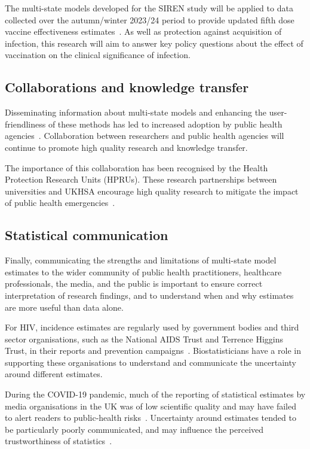 The multi-state models developed for the SIREN study will be applied to data collected over the autumn/winter 2023/24 period to provide updated fifth dose vaccine effectiveness estimates~\parencite{UK_Health_Security_Agency2023-xb}. As well as protection against acquisition of infection, this research will aim to answer key policy questions about the effect of vaccination on the clinical significance of infection.

\subsection{Collaborations and knowledge transfer}

Disseminating information about multi-state models and enhancing the user-friendliness of these methods has led to increased adoption by public health agencies~\parencite{van-Sighem2015-zo, Kirwan2024-hj}. Collaboration between researchers and public health agencies will continue to promote high quality research and knowledge transfer.

The importance of this collaboration has been recognised by the Health Protection Research Units (HPRUs). These research partnerships between universities and UKHSA encourage high quality research to mitigate the impact of public health emergencies~\parencite{National-Institute-for-Health-and-Care-Research2024-oq}.

\subsection{Statistical communication}

Finally, communicating the strengths and limitations of multi-state model estimates to the wider community of public health practitioners, healthcare professionals, the media, and the public is important to ensure correct interpretation of research findings, and to understand when and why estimates are more useful than data alone.

For HIV, incidence estimates are regularly used by government bodies and third sector organisations, such as the National AIDS Trust and Terrence Higgins Trust, in their reports and prevention campaigns~\parencite{Martin2023-um, Terrence-Higgins-Trust2023-vk}. Biostatisticians have a role in supporting these organisations to understand and communicate the uncertainty around different estimates.

During the COVID-19 pandemic, much of the reporting of statistical estimates by media organisations in the UK was of low scientific quality and may have failed to alert readers to public-health risks~\parencite{Mach2021-gn}. Uncertainty around estimates tended to be particularly poorly communicated, and may influence the perceived trustworthiness of statistics~\parencite{van-der-Bles2019-kq, Schneider2022-pe}.
